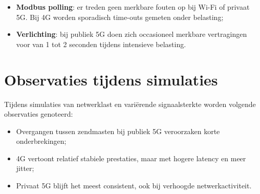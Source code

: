 \begin{itemize}
    \item \textbf{Modbus polling}: er treden geen merkbare fouten op bij Wi-Fi of privaat 5G. Bij 4G worden sporadisch time-outs gemeten onder belasting;
    \item \textbf{Verlichting}: bij publiek 5G doen zich occasioneel merkbare vertragingen voor van 1 tot 2 seconden tijdens intensieve belasting.
\end{itemize}

\section{Observaties tijdens simulaties}

Tijdens simulaties van netwerklast en variërende signaalsterkte worden volgende observaties genoteerd:

\begin{itemize}
    \item Overgangen tussen zendmasten bij publiek 5G veroorzaken korte onderbrekingen;
    \item 4G vertoont relatief stabiele prestaties, maar met hogere latency en meer jitter;
    \item Privaat 5G blijft het meest consistent, ook bij verhoogde netwerkactiviteit.
\end{itemize}


